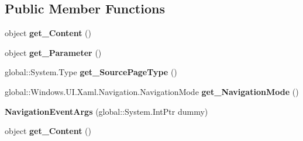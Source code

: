 \subsection*{Public Member Functions}
\begin{DoxyCompactItemize}
\item 
\mbox{\label{class_windows_1_1_u_i_1_1_xaml_1_1_navigation_1_1_navigation_event_args_a08025ec2d6281a3208e53e79b28fe731}} 
object {\bfseries get\+\_\+\+Content} ()
\item 
\mbox{\label{class_windows_1_1_u_i_1_1_xaml_1_1_navigation_1_1_navigation_event_args_a390c547083328026c7cc65d9f4947c44}} 
object {\bfseries get\+\_\+\+Parameter} ()
\item 
\mbox{\label{class_windows_1_1_u_i_1_1_xaml_1_1_navigation_1_1_navigation_event_args_ac40ea82c6530db5f1c147e0d50f539d5}} 
global\+::\+System.\+Type {\bfseries get\+\_\+\+Source\+Page\+Type} ()
\item 
\mbox{\label{class_windows_1_1_u_i_1_1_xaml_1_1_navigation_1_1_navigation_event_args_a49b9eb754f028f3775a11aa7e9b33ecd}} 
global\+::\+Windows.\+U\+I.\+Xaml.\+Navigation.\+Navigation\+Mode {\bfseries get\+\_\+\+Navigation\+Mode} ()
\item 
\mbox{\label{class_windows_1_1_u_i_1_1_xaml_1_1_navigation_1_1_navigation_event_args_a78e228ec4fa7026f8047bfe00cd0eae8}} 
{\bfseries Navigation\+Event\+Args} (global\+::\+System.\+Int\+Ptr dummy)
\item 
\mbox{\label{class_windows_1_1_u_i_1_1_xaml_1_1_navigation_1_1_navigation_event_args_a08025ec2d6281a3208e53e79b28fe731}} 
object {\bfseries get\+\_\+\+Content} ()
\item 
\mbox{\label{class_windows_1_1_u_i_1_1_xaml_1_1_navigation_1_1_navigation_event_args_a390c547083328026c7cc65d9f4947c44}} 

\end{DoxyCompactItemize}
